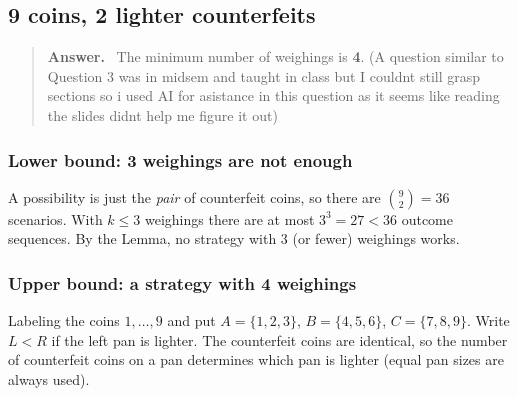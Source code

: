 \documentclass[11pt,a4paper]{article}
\newenvironment{claimbox}[1][]{\par\smallskip\begin{quote}\textbf{#1.}\ \itshape}{\end{quote}}
\newenvironment{answerbox}[1][Answer]{\par\smallskip\begin{quote}\textbf{#1.}\ }{\end{quote}}
\theoremstyle{definition}
\begin{document}

\subsection{9 coins, 2 lighter counterfeits}

\begin{answerbox}
The minimum number of weighings is \textbf{4}. (A question similar to Question 3 was in midsem and taught in class but I couldnt still grasp sections so i used AI for asistance in this question as it seems like reading the slides didnt help me figure it out)
\end{answerbox}

\subsubsection*{Lower bound: 3 weighings are not enough}
A possibility is just the \emph{pair} of counterfeit coins, so there are $\binom92=36$ scenarios. With $k\le3$ weighings there are at most $3^3=27<36$ outcome sequences. By the Lemma, no strategy with $3$ (or fewer) weighings works. 



\subsubsection*{Upper bound: a strategy with 4 weighings}
Labeling the coins $1,\dots,9$ and put $A=\{1,2,3\}$, $B=\{4,5,6\}$, $C=\{7,8,9\}$. Write $L<R$ if the left pan is lighter. 
The counterfeit coins are identical, so the number of counterfeit coins on a pan determines which pan is lighter (equal pan sizes are always used).
\end{document}
